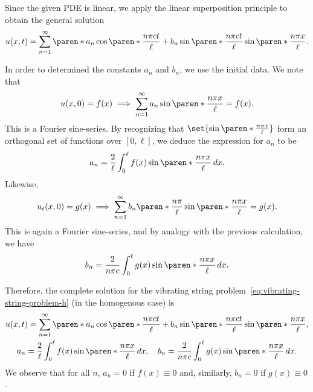 \documentclass[11pt]{penrose}
\begin{document}
Since the given PDE is linear, we apply the linear superposition principle to obtain the general solution
\begin{equation}
    u(x,t) = \sum_{n=1}^{\infty} \paren*{a_{n} \cos\paren*{\frac{n \pi ct}{\ell}} + b_{n} \sin\paren*{\frac{n \pi ct}{\ell}}} \sin\paren*{\frac{n \pi x}{\ell}}.
\end{equation}

In order to determined the constants $a_n$ and $b_n$, we use the initial data. We note that
\begin{equation}
    u(x,0) = f(x)
    \implies
    \sum_{n=1}^{\infty} a_n \sin\paren*{\frac{n \pi x}{\ell}} = f(x).
\end{equation}
This is a Fourier sine-series. By recognizing that $\set{ \sin\paren*{\frac{n \pi x}{\ell}} }$ form an orthogonal set of functions over $[0, \ell]$, we deduce the expression for $a_n$ to be
\begin{equation*}
    a_n = \frac{2}{\ell} \int_0^\ell f(x) \sin\paren*{\frac{n \pi x}{\ell}} \,dx.
\end{equation*}
Likewise,
\begin{equation}
    u_t (x,0) = g(x)
    \implies
    \sum_{n=1}^{\infty} b_n \paren*{\frac{n \pi}{\ell}} \sin\paren*{\frac{n \pi x}{\ell}} = g(x).
\end{equation}
This is again a Fourier sine-series, and by analogy with the previous calculation, we have
\begin{equation*}
    b_n = \frac{2}{n \pi c} \int_0^\ell g(x) \sin\paren*{\frac{n \pi x}{\ell}} \,dx.
\end{equation*}

Therefore, the complete solution for the vibrating string problem~\eqref{eq:vibrating-string-problem-h} (in the homogenous case) is
\begin{equation}
\begin{gathered}
    u(x,t) = \sum_{n=1}^{\infty} \paren*{a_{n} \cos\paren*{\frac{n \pi ct}{\ell}} + b_{n} \sin\paren*{\frac{n \pi ct}{\ell}}} \sin\paren*{\frac{n \pi x}{\ell}},\\
    a_n = \frac{2}{\ell} \int_0^\ell f(x) \sin\paren*{\frac{n \pi x}{\ell}} \,dx,
    \quad
    b_n = \frac{2}{n \pi c} \int_0^\ell g(x) \sin\paren*{\frac{n \pi x}{\ell}} \,dx.
\end{gathered}
\end{equation}
We observe that for all $n$, $a_n = 0$ if $f(x) \equiv 0$ and, similarly, $b_n = 0$ if $g(x) \equiv 0$.
\end{document}
